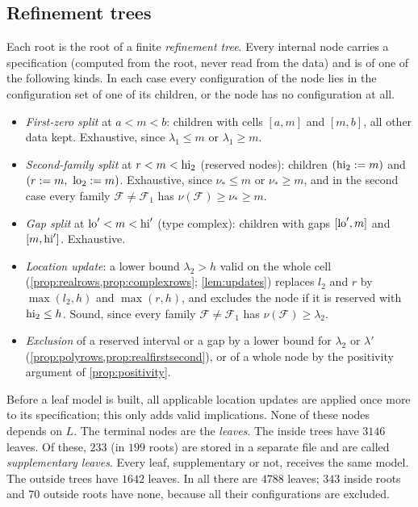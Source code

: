 \subsection{Refinement trees}\label{subsec:refinement}
Each root is the root of a finite \emph{refinement tree}. Every internal node carries a
specification (computed from the root, never read from the data) and is of one of the following
kinds. In each case every configuration of the node lies in the configuration set of one of its
children, or the node has no configuration at all.
\begin{itemize}
  \item \emph{First-zero split} at $a<m<b$: children with cells $[a,m]$ and $[m,b]$, all other data
    kept. Exhaustive, since $\lambda_1\le m$ or $\lambda_1\ge m$.
  \item \emph{Second-family split} at $r<m<\mathrm{hi}_2$ (reserved nodes): children $(\mathrm{hi}_2:=m)$ and
    $(r:=m,\ \mathrm{lo}_2:=m)$. Exhaustive, since $\nu_*\le m$ or $\nu_*\ge m$, and in the second case every
    family $\mathcal F\ne\mathcal F_1$ has $\nu(\mathcal F)\ge\nu_*\ge m$.
  \item \emph{Gap split} at $\mathrm{lo}'<m<\mathrm{hi}'$ (type $\mathrm{complex}$): children with gaps $[\mathrm{lo}',m]$ and
    $[m,\mathrm{hi}']$. Exhaustive.
  \item \emph{Location update}: a lower bound $\lambda_2>h$ valid on the whole cell
    (\cref{prop:realrows,prop:complexrows}; \cref{lem:updates}) replaces $l_2$ and $r$ by $\max(l_2,h)$ and
    $\max(r,h)$, and excludes the node if it is reserved with $\mathrm{hi}_2\le h$. Sound, since every family
    $\mathcal F\ne\mathcal F_1$ has $\nu(\mathcal F)\ge\lambda_2$.
  \item \emph{Exclusion} of a reserved interval or a gap by a lower bound for $\lambda_2$ or
    $\lambda'$ (\cref{prop:polyrows,prop:realfirstsecond}), or of a whole node by the positivity
    argument of \cref{prop:positivity}.
\end{itemize}
Before a leaf model is built, all applicable location updates are applied once more to its
specification; this only adds valid implications. None of these nodes depends on $L$. The terminal
nodes are the \emph{leaves}. The inside trees have $3146$ leaves. Of these, $233$ (in $199$ roots) are
stored in a separate file and are called \emph{supplementary leaves}. Every leaf,
supplementary or not, receives the same model. The
outside trees have $1642$ leaves. In all there are $4788$ leaves; $343$ inside roots and $70$
outside roots have none, because all their configurations are excluded.

